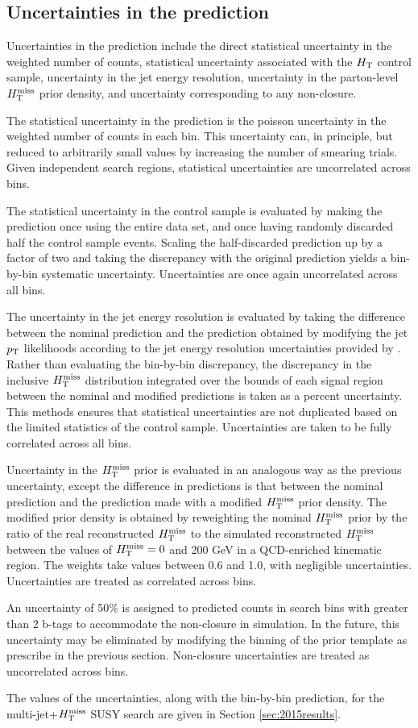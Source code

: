 \subsection{Uncertainties in the prediction}
Uncertainties in the prediction include the direct statistical uncertainty in the weighted number of counts, statistical uncertainty associated with the $H_{\rm T}$ control sample, uncertainty in the jet energy resolution, uncertainty in the parton-level $H_{\text{T}}^{\rm miss}$ prior density, and uncertainty corresponding to any non-closure. 

The statistical uncertainty in the prediction is the poisson uncertainty in the weighted number of counts in each bin. This uncertainty can, in principle, but reduced to arbitrarily small values by increasing the number of smearing trials. Given independent search regions, statistical uncertainties are uncorrelated across bins. 

The statistical uncertainty in the control sample is evaluated by making the prediction once using the entire data set, and once having randomly discarded half the control sample events. Scaling the half-discarded prediction up by a factor of two and taking the discrepancy with the original prediction yields a bin-by-bin systematic uncertainty. Uncertainties are once again uncorrelated across all bins.

The uncertainty in the jet energy resolution is evaluated by taking the difference between the nominal prediction and the prediction obtained by modifying the jet $p_{\text{T}}$ likelihoods according to the jet energy resolution uncertainties provided by  \cite{jetmet2}. Rather than evaluating the bin-by-bin discrepancy, the discrepancy in the inclusive $H_{\text{T}}^{\rm miss}$ distribution integrated over the bounds of each signal region between the nominal and modified predictions is taken as a percent uncertainty. This methods ensures that statistical uncertainties are not duplicated based on the limited statistics of the control sample. Uncertainties are taken to be fully correlated across all bins.

Uncertainty in the $H_{\text{T}}^{\rm miss}$ prior is evaluated in an analogous way as the previous uncertainty, except the difference in predictions is that between the nominal prediction and the prediction made with a modified $H_{\text{T}}^{\rm miss}$ prior density. The modified prior density is obtained by reweighting the nominal $H_{\text{T}}^{\rm miss}$ prior by the ratio of the real reconstructed $H_{\text{T}}^{\rm miss}$ to the simulated reconstructed $H_{\text{T}}^{\rm miss}$ between the values of $H_{\text{T}}^{\rm miss}=0$ and 200 GeV in a QCD-enriched kinematic region. The weights take values between 0.6 and 1.0, with negligible uncertainties. Uncertainties are treated as correlated across bins.

An uncertainty of 50\% is assigned to predicted counts in search bins with greater than 2 b-tags to accommodate the non-closure in simulation. In the future, this uncertainty may be eliminated by modifying the binning of the prior template as prescribe in the previous section. Non-closure uncertainties are treated as uncorrelated across bins. 

The values of the uncertainties, along with the bin-by-bin prediction, for the multi-jet$+$$H_{\text{T}}^{\rm miss}$ SUSY search are given in Section \ref{sec:2015results}.
\FloatBarrier
